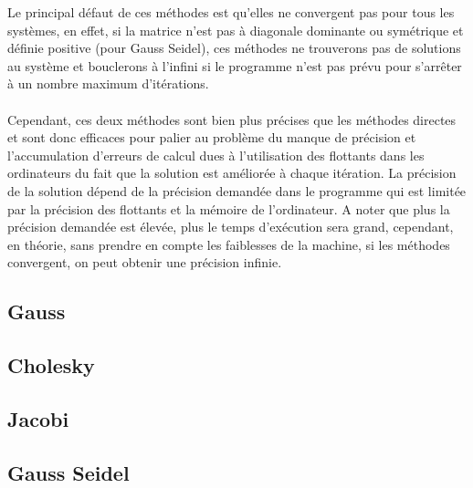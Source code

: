 \documentclass[a4paper]{article}
\begin{document}
Le principal défaut de ces méthodes est qu'elles ne convergent pas pour tous les
systèmes, en effet, si la matrice n'est pas à diagonale dominante ou symétrique
et définie positive (pour Gauss Seidel), ces méthodes ne trouverons pas de
solutions au système et bouclerons à l'infini si le programme n'est pas prévu
pour s'arrêter à un nombre maximum d'itérations.
\\
\\
Cependant, ces deux méthodes sont bien plus précises que les méthodes directes
et sont donc efficaces pour palier au problème du manque de précision et
l'accumulation d'erreurs de calcul dues à l'utilisation des flottants dans les
ordinateurs du fait que la solution est améliorée à chaque itération. La
précision de la solution dépend de la précision demandée dans le programme qui
est limitée par la précision des flottants et la mémoire de l'ordinateur. A noter
que plus la précision demandée est élevée, plus le temps d’exécution sera grand,
cependant, en théorie, sans prendre en compte les faiblesses de la machine, si
les méthodes convergent, on peut obtenir une précision infinie.

\clearpage


\begin{appendix}
  \section*{Gauss}
  
\end{appendix}
\clearpage


\begin{appendix}
  \section*{Cholesky}
  
\end{appendix}
\clearpage


\begin{appendix}
  \section*{Jacobi}
  
\end{appendix}
\clearpage


\begin{appendix}
  \section*{Gauss Seidel}
    
\end{appendix}
\end{document}
